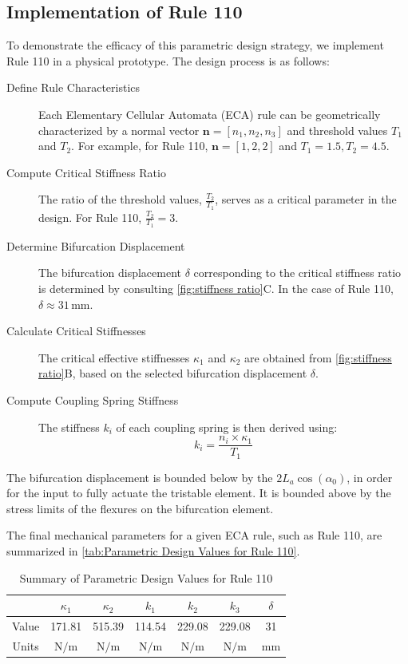 \subsection*{Implementation of Rule 110}

To demonstrate the efficacy of this parametric design strategy, we implement Rule 110 in a physical prototype. The design process is as follows:

\begin{description}
    \item[Define Rule Characteristics] Each Elementary Cellular Automata (ECA) rule can be geometrically characterized by a normal vector \( \mathbf{n} = [n_1, n_2, n_3] \) and threshold values \( T_1 \) and \( T_2 \). For example, for Rule 110, \( \mathbf{n} = [1, 2, 2] \) and \( T_1 = 1.5, T_2 = 4.5 \).
    
    \item[Compute Critical Stiffness Ratio] The ratio of the threshold values, \( \frac{T_2}{T_1} \), serves as a critical parameter in the design. For Rule 110, \( \frac{T_2}{T_1} = 3 \).
    
    \item[Determine Bifurcation Displacement] The bifurcation displacement \( \delta \) corresponding to the critical stiffness ratio is determined by consulting \autoref*{fig:stiffness ratio}C. In the case of Rule 110, \( \delta \approx 31 \, \text{mm} \).
    
    \item[Calculate Critical Stiffnesses] The critical effective stiffnesses \( \kappa_1 \) and \( \kappa_2 \) are obtained from \autoref*{fig:stiffness ratio}B, based on the selected bifurcation displacement \( \delta \).
    
    \item[Compute Coupling Spring Stiffness] The stiffness \( k_i \) of each coupling spring is then derived using:
    \[
    k_i = \frac{n_i \times \kappa_1}{T_1}
    \]
\end{description}
 The bifurcation displacement is bounded below by the \(2L_a\cos(\alpha_0)\), in order for the input to fully actuate the tristable element. It is bounded above by the stress limits of the flexures on the bifurcation element. 

The final mechanical parameters for a given ECA rule, such as Rule 110, are summarized in \autoref*{tab:Parametric Design Values for Rule 110}.

\begin{table}[h]
\centering
\begin{tabular}{|c|c|c|c|c|c|c|}
    \hline
      & \( \kappa_1 \) & \( \kappa_2 \) & \( k_1 \) & \( k_2 \) & \( k_3 \) & \( \delta \) \\
    \hline
    Value & 171.81 & 515.39 & 114.54 & 229.08 & 229.08 & 31 \\
    \hline
    Units & \( \text{N/m} \) & \( \text{N/m} \) & \( \text{N/m} \) & \( \text{N/m} \) & \( \text{N/m} \) & \( \text{mm} \) \\
    \hline
    \end{tabular}
\caption{Summary of Parametric Design Values for Rule 110}
\label{tab:Parametric Design Values for Rule 110}
\end{table}

